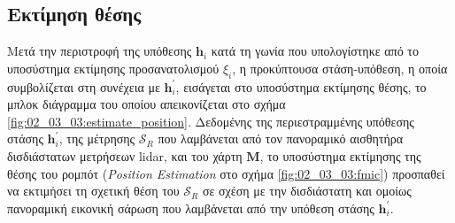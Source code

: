 \subsection{Εκτίμηση θέσης}
\label{subsection:02_03_03:03}

Μετά την περιστροφή της υπόθεσης $\bm{h}_i$ κατά τη γωνία που υπολογίστηκε από
το υποσύστημα εκτίμησης προσανατολισμού $\xi_i$, η προκύπτουσα στάση-υπόθεση, η
οποία συμβολίζεται στη συνέχεια με $\bm{h}_i^\prime$, εισάγεται στο υποσύστημα
εκτίμησης θέσης, το μπλοκ διάγραμμα του οποίου απεικονίζεται στο σχήμα
\ref{fig:02_03_03:estimate_position}.  Δεδομένης της περιεστραμμένης
υπόθεσης στάσης $\bm{h}_i^\prime$, της μέτρησης $\mathcal{S}_R$ που λαμβάνεται
από τον πανοραμικό αισθητήρα δισδιάστατων μετρήσεων lidar, και του χάρτη
$\bm{M}$, το υποσύστημα εκτίμησης της θέσης του ρομπότ (\textit{Position
Estimation} στο σχήμα \ref{fig:02_03_03:fmic}) προσπαθεί να εκτιμήσει τη
σχετική θέση του $\mathcal{S}_R$ σε σχέση με την δισδιάστατη και ομοίως
πανοραμική εικονική σάρωση που λαμβάνεται από την υπόθεση στάσης
$\bm{h}_i^\prime$.

